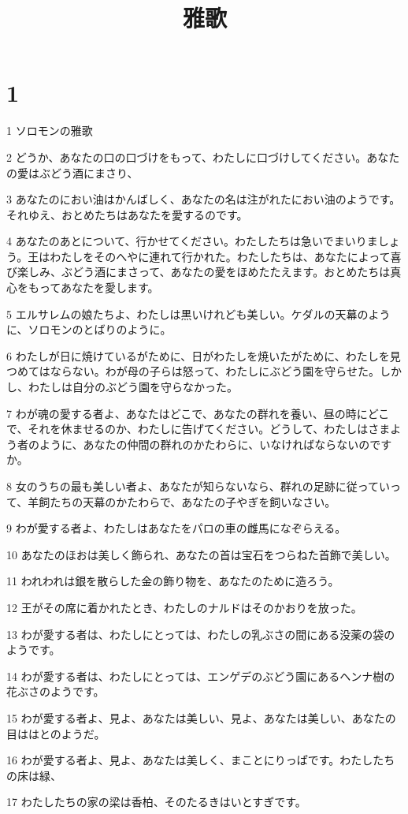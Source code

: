 

\title{雅歌}


\chapter{1}

\par 1 ソロモンの雅歌
\par 2 どうか、あなたの口の口づけをもって、わたしに口づけしてください。あなたの愛はぶどう酒にまさり、
\par 3 あなたのにおい油はかんばしく、あなたの名は注がれたにおい油のようです。それゆえ、おとめたちはあなたを愛するのです。
\par 4 あなたのあとについて、行かせてください。わたしたちは急いでまいりましょう。王はわたしをそのへやに連れて行かれた。わたしたちは、あなたによって喜び楽しみ、ぶどう酒にまさって、あなたの愛をほめたたえます。おとめたちは真心をもってあなたを愛します。
\par 5 エルサレムの娘たちよ、わたしは黒いけれども美しい。ケダルの天幕のように、ソロモンのとばりのように。
\par 6 わたしが日に焼けているがために、日がわたしを焼いたがために、わたしを見つめてはならない。わが母の子らは怒って、わたしにぶどう園を守らせた。しかし、わたしは自分のぶどう園を守らなかった。
\par 7 わが魂の愛する者よ、あなたはどこで、あなたの群れを養い、昼の時にどこで、それを休ませるのか、わたしに告げてください。どうして、わたしはさまよう者のように、あなたの仲間の群れのかたわらに、いなければならないのですか。
\par 8 女のうちの最も美しい者よ、あなたが知らないなら、群れの足跡に従っていって、羊飼たちの天幕のかたわらで、あなたの子やぎを飼いなさい。
\par 9 わが愛する者よ、わたしはあなたをパロの車の雌馬になぞらえる。
\par 10 あなたのほおは美しく飾られ、あなたの首は宝石をつらねた首飾で美しい。
\par 11 われわれは銀を散らした金の飾り物を、あなたのために造ろう。
\par 12 王がその席に着かれたとき、わたしのナルドはそのかおりを放った。
\par 13 わが愛する者は、わたしにとっては、わたしの乳ぶさの間にある没薬の袋のようです。
\par 14 わが愛する者は、わたしにとっては、エンゲデのぶどう園にあるヘンナ樹の花ぶさのようです。
\par 15 わが愛する者よ、見よ、あなたは美しい、見よ、あなたは美しい、あなたの目ははとのようだ。
\par 16 わが愛する者よ、見よ、あなたは美しく、まことにりっぱです。わたしたちの床は緑、
\par 17 わたしたちの家の梁は香柏、そのたるきはいとすぎです。

